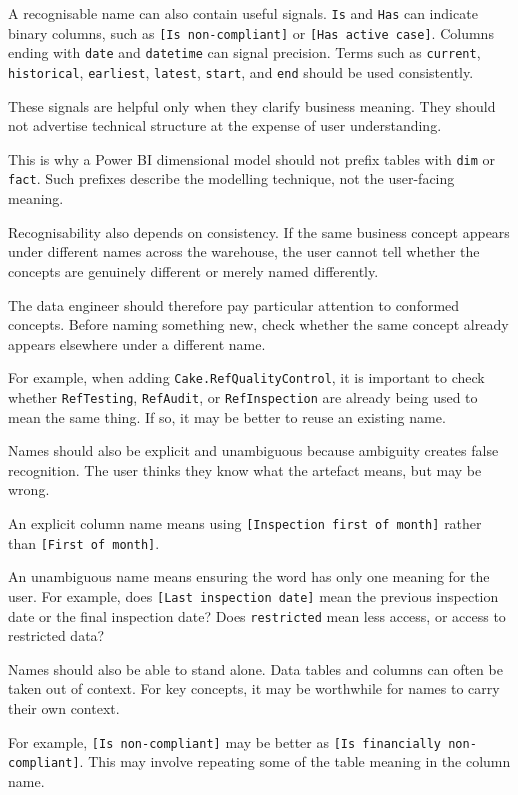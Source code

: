 \documentclass[10pt,openany,10pt]{book}
\begin{document}
A recognisable name can also contain useful signals. \texttt{Is} and
\texttt{Has} can indicate binary columns, such as
\texttt{{[}Is\ non-compliant{]}} or \texttt{{[}Has\ active\ case{]}}.
Columns ending with \texttt{date} and \texttt{datetime} can signal
precision. Terms such as \texttt{current}, \texttt{historical},
\texttt{earliest}, \texttt{latest}, \texttt{start}, and \texttt{end}
should be used consistently.

These signals are helpful only when they clarify business meaning. They
should not advertise technical structure at the expense of user
understanding.

This is why a Power BI dimensional model should not prefix tables with
\texttt{dim} or \texttt{fact}. Such prefixes describe the modelling
technique, not the user-facing meaning.

Recognisability also depends on consistency. If the same business
concept appears under different names across the warehouse, the user
cannot tell whether the concepts are genuinely different or merely named
differently.

The data engineer should therefore pay particular attention to conformed
concepts. Before naming something new, check whether the same concept
already appears elsewhere under a different name.

For example, when adding \texttt{Cake.RefQualityControl}, it is
important to check whether \texttt{RefTesting}, \texttt{RefAudit}, or
\texttt{RefInspection} are already being used to mean the same thing. If
so, it may be better to reuse an existing name.

Names should also be explicit and unambiguous because ambiguity creates
false recognition. The user thinks they know what the artefact means,
but may be wrong.

An explicit column name means using
\texttt{{[}Inspection\ first\ of\ month{]}} rather than
\texttt{{[}First\ of\ month{]}}.

An unambiguous name means ensuring the word has only one meaning for the
user. For example, does \texttt{{[}Last\ inspection\ date{]}} mean the
previous inspection date or the final inspection date? Does
\texttt{restricted} mean less access, or access to restricted data?

Names should also be able to stand alone. Data tables and columns can
often be taken out of context. For key concepts, it may be worthwhile
for names to carry their own context.

For example, \texttt{{[}Is\ non-compliant{]}} may be better as
\texttt{{[}Is\ financially\ non-compliant{]}}. This may involve
repeating some of the table meaning in the column name.
\end{document}
